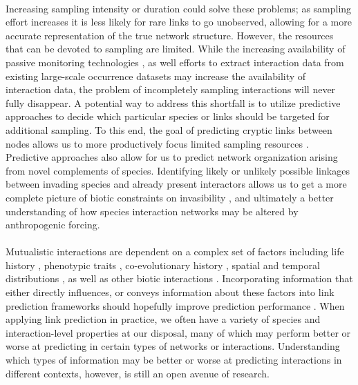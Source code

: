 \paragraph*{}
Increasing sampling intensity or duration could solve these problems; as sampling effort increases it is less likely for rare links to go unobserved, allowing for a more accurate representation of the true network structure. However, the resources that can be devoted to sampling are limited. While the increasing availability of passive monitoring technologies \parencite{quintero2022methodological}, as well efforts to extract interaction data from existing large-scale occurrence datasets \parencite{putman2021power} may increase the availability of interaction data, the problem of incompletely sampling interactions will never fully disappear. A potential way to address this shortfall is to utilize predictive approaches to decide which particular species or links should be targeted for additional sampling. To this end, the goal of predicting cryptic links between nodes allows us to more productively focus limited sampling resources \parencite{terry2020finding}. Predictive approaches also allow for us to predict network organization arising from novel complements of species. Identifying likely or unlikely possible linkages between invading species and already present interactors allows us to get a more complete picture of biotic constraints on invasibility \parencite{minoarivelo2016invading}, and ultimately a better understanding of how species interaction networks may be altered by anthropogenic forcing.  

\paragraph*{}
Mutualistic interactions are dependent on a complex set of factors including life history \parencite{ramos2018fruit}, phenotypic traits \parencite{rafferty2013}, co-evolutionary history \parencite{eriksson2016evolution}, spatial and temporal distributions \parencite{menke2012plant, fricke2020accelerating, laurindo2020drivers}, as well as other biotic interactions \parencite{carreira2020question}. Incorporating information that either directly influences, or conveys information about these factors into link prediction frameworks should hopefully improve prediction performance \parencite{dallas2017predicting}. When applying link prediction in practice, we often have a variety of species and interaction-level properties at our disposal, many of which may perform better or worse at predicting in certain types of networks or interactions. Understanding which types of information may be better or worse at predicting interactions in different contexts, however, is still an open avenue of research. 

